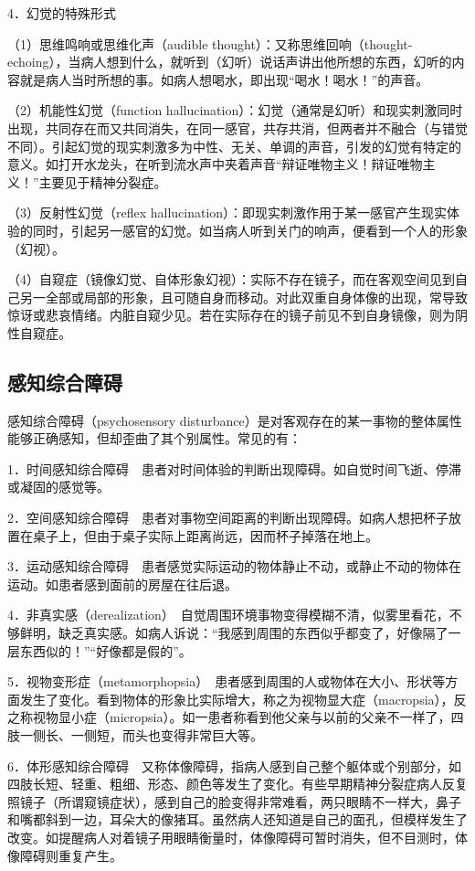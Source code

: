 4．幻觉的特殊形式

（1）思维鸣响或思维化声（audible
thought）：又称思维回响（thought-echoing），当病人想到什么，就听到（幻听）说话声讲出他所想的东西，幻听的内容就是病人当时所想的事。如病人想喝水，即出现``喝水！喝水！''的声音。

（2）机能性幻觉（function
hallucination）：幻觉（通常是幻听）和现实刺激同时出现，共同存在而又共同消失，在同一感官，共存共消，但两者并不融合（与错觉不同）。引起幻觉的现实刺激多为中性、无关、单调的声音，引发的幻觉有特定的意义。如打开水龙头，在听到流水声中夹着声音``辩证唯物主义！辩证唯物主义！''主要见于精神分裂症。

（3）反射性幻觉（reflex
hallucination）：即现实刺激作用于某一感官产生现实体验的同时，引起另一感官的幻觉。如当病人听到关门的响声，便看到一个人的形象（幻视）。

（4）自窥症（镜像幻觉、自体形象幻视）：实际不存在镜子，而在客观空间见到自己另一全部或局部的形象，且可随自身而移动。对此双重自身体像的出现，常导致惊讶或悲哀情绪。内脏自窥少见。若在实际存在的镜子前见不到自身镜像，则为阴性自窥症。

\subsection{感知综合障碍}

感知综合障碍（psychosensory
disturbance）是对客观存在的某一事物的整体属性能够正确感知，但却歪曲了其个别属性。常见的有：

1．时间感知综合障碍　患者对时间体验的判断出现障碍。如自觉时间飞逝、停滞或凝固的感觉等。

2．空间感知综合障碍　患者对事物空间距离的判断出现障碍。如病人想把杯子放置在桌子上，但由于桌子实际上距离尚远，因而杯子掉落在地上。

3．运动感知综合障碍　患者感觉实际运动的物体静止不动，或静止不动的物体在运动。如患者感到面前的房屋在往后退。

4．非真实感（derealization）　自觉周围环境事物变得模糊不清，似雾里看花，不够鲜明，缺乏真实感。如病人诉说：``我感到周围的东西似乎都变了，好像隔了一层东西似的！''``好像都是假的''。

5．视物变形症（metamorphopsia）　患者感到周围的人或物体在大小、形状等方面发生了变化。看到物体的形象比实际增大，称之为视物显大症（macropsia），反之称视物显小症（micropsia）。如一患者称看到他父亲与以前的父亲不一样了，四肢一侧长、一侧短，而头也变得非常巨大等。

6．体形感知综合障碍　又称体像障碍，指病人感到自己整个躯体或个别部分，如四肢长短、轻重、粗细、形态、颜色等发生了变化。有些早期精神分裂症病人反复照镜子（所谓窥镜症状），感到自己的脸变得非常难看，两只眼睛不一样大，鼻子和嘴都斜到一边，耳朵大的像猪耳。虽然病人还知道是自己的面孔，但模样发生了改变。如提醒病人对着镜子用眼睛衡量时，体像障碍可暂时消失，但不目测时，体像障碍则重复产生。

